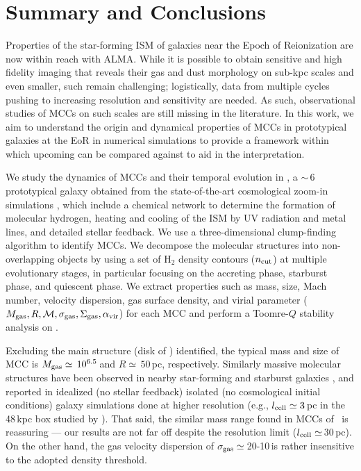 \IfFileExists{emulateapjlegacy.cls}{\documentclass[iop]{emulateapjlegacy}}{\documentclass[iop]{emulateapj}}
\begin{document}
\section{Summary and Conclusions}      \label{sec:conclusion}

Properties of the star-forming ISM of galaxies near the Epoch of Reionization are now within reach with ALMA. While it is possible to obtain sensitive and high fidelity imaging that reveals their gas and dust morphology on sub-kpc scales and even smaller, such \obs remain challenging; logistically, data from multiple cycles pushing to increasing resolution and sensitivity are needed. As such, observational studies of MCCs on such scales are still missing in the literature.
%
In this work, we aim to understand the origin and dynamical properties of MCCs in prototypical galaxies at the EoR in numerical simulations to provide a framework within which upcoming \obs can be compared against to aid in the interpretation.

We study the dynamics of MCCs and their temporal evolution in \flower, a \z$\sim$\,6 prototypical galaxy obtained from the state-of-the-art cosmological zoom-in simulations , which include a chemical network to determine the formation of molecular hydrogen, heating and cooling of the ISM by UV radiation and metal lines, and detailed stellar feedback.
%
We use a three-dimensional clump-finding algorithm to identify MCCs. We decompose the molecular structures into non-overlapping objects by using a set of H$_2$ density contours ($n_{\rm cut}$) at multiple evolutionary stages, in particular focusing on the accreting phase, starburst phase, and quiescent phase. We extract properties such as mass, size, Mach number, velocity dispersion, gas surface density, and virial parameter ($M_{\rm gas}, R, \mathcal{M}, \sigma_{\rm gas}, \Sigma_{\rm gas}, \alpha_{\rm vir}$) for each MCC and perform a Toomre-$Q$ stability analysis on \flower.

Excluding the main structure (disk of \flower) identified, the typical mass and size of MCC is $M_{\rm gas}\simeq\,10^{6.5}$\,\Msun and $R\simeq\,50$\,pc, respectively. Similarly massive molecular structures have been observed in nearby star-forming and starburst galaxies \citep[e.g.,][]{Keto05a, DonovanMeyer13a, Colombo14a, Leroy15a}, and reported in idealized (no stellar feedback) isolated (no cosmological initial conditions) galaxy simulations done at higher resolution (e.g., $l_{\rm cell}\simeq3$\,pc in the 48\,kpc box studied by \citealt{Behrendt16a}). That said, the similar mass range found in MCCs of \flower\ is reassuring --- our results are not far off despite the resolution limit ($l_{\rm cell}\simeq$\,30\,pc). On the other hand, the gas velocity dispersion
of $\sigma_{\rm gas}\simeq$\,20-10\,\kms is rather insensitive to the adopted density threshold.
\end{document}
